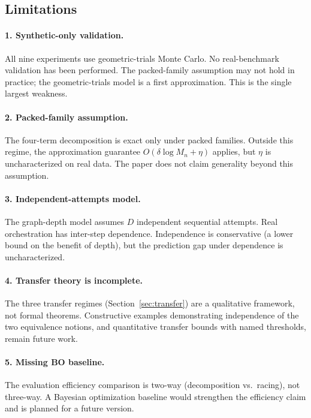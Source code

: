 \documentclass[twoside,11pt]{article}
\newcommand{\Mn}{M_n}
\begin{document}
\subsection{Limitations}

\paragraph{1. Synthetic-only validation.}
All nine experiments use geometric-trials Monte Carlo.
No real-benchmark validation has been performed.
The packed-family assumption may not hold in practice; the geometric-trials model is a first approximation.
This is the single largest weakness.

\paragraph{2. Packed-family assumption.}
The four-term decomposition is exact only under packed families.
Outside this regime, the approximation guarantee $O(\delta \log \Mn + \eta)$ applies, but $\eta$ is uncharacterized on real data.
The paper does not claim generality beyond this assumption.

\paragraph{3. Independent-attempts model.}
The graph-depth model assumes $D$ independent sequential attempts.
Real orchestration has inter-step dependence.
Independence is conservative (a lower bound on the benefit of depth), but the prediction gap under dependence is uncharacterized.

\paragraph{4. Transfer theory is incomplete.}
The three transfer regimes (Section~\ref{sec:transfer}) are a qualitative framework, not formal theorems.
Constructive examples demonstrating independence of the two equivalence notions, and quantitative transfer bounds with named thresholds, remain future work.

\paragraph{5. Missing BO baseline.}
The evaluation efficiency comparison is two-way (decomposition vs.\ racing), not three-way.
A Bayesian optimization baseline would strengthen the efficiency claim and is planned for a future version.
\end{document}
